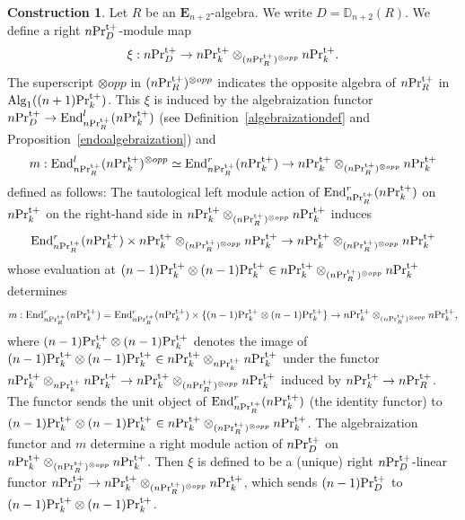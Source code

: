 \documentclass[leqno,12pt]{amsart}
\theoremstyle{plain}
\theoremstyle{definition}
\newtheorem{Construction}[Theorem]{Construction}
\newcommand{\DD}{\mathbb{D}}
\newcommand{\PRTT}{\textup{Pr}^{\textup{t}+}}
\newcommand{\Alg}{\operatorname{Alg}}
\newcommand{\End}{\operatorname{End}}
\begin{document}
\begin{Construction}
\label{xidefine}
Let $R$ be an $\mathbf{E}_{n+2}$-algebra.
We write $D=\DD_{n+2}(R)$.
We define a right  $n\PRTT_D$-module map
\[
\xi:n\PRTT_{D}\to n\PRTT_k\otimes_{(n\PRTT_R)^{\otimes opp}}n\PRTT_k.
\]
The superscript $\otimes opp$ in $(n\PRTT_R)^{\otimes opp}$ indicates the opposite algebra of $n\PRTT_R$ in $\Alg_1((n+1)\PRTT_k)$.
This $\xi$ is
induced by the algebraization functor $n\PRTT_{D}\to \End_{n\PRTT_R}^l(n\PRTT_k)$ (see Definition~\ref{algebraizationdef} and Proposition~\ref{endoalgebraization})
and 
\[
m: \End_{n\PRTT_R}^l(n\PRTT_k)^{\otimes opp}  \simeq \End_{n\PRTT_R}^r(n\PRTT_k)\to n\PRTT_k\otimes_{(n\PRTT_R)^{\otimes opp}}n\PRTT_k
\]
defined as follows: The tautological left module action of $\End_{n\PRTT_R}^r(n\PRTT_k)$ on $n\PRTT_k$ on the right-hand side in $n\PRTT_k\otimes_{(n\PRTT_R)^{\otimes opp}}n\PRTT_k$
induces
\[
\End_{n\PRTT_R}^r(n\PRTT_k)\times n\PRTT_k\otimes_{(n\PRTT_R)^{\otimes opp}}n\PRTT_k\to n\PRTT_k\otimes_{(n\PRTT_R)^{\otimes opp}}n\PRTT_k
\]
whose evaluation at $(n-1)\PRTT_k\otimes (n-1)\PRTT_k\in n\PRTT_k\otimes_{(n\PRTT_R)^{\otimes opp}}n\PRTT_k$ determines
\[
m:\End_{n\PRTT_R}^r(n\PRTT_k)  = \End_{n\PRTT_R}^r(n\PRTT_k)\times \{ (n-1)\PRTT_k\otimes (n-1)\PRTT_k  \}\to n\PRTT_k\otimes_{(n\PRTT_R)^{\otimes opp}}n\PRTT_k,
\]
where $(n-1)\PRTT_k\otimes (n-1)\PRTT_k$ denotes the image of $ (n-1)\PRTT_k\otimes (n-1)\PRTT_k\in n\PRTT_k\otimes_{n\PRTT_k}n\PRTT_k$
under the functor $ n\PRTT_k\otimes_{n\PRTT_k}n\PRTT_k\to  n\PRTT_k\otimes_{(n\PRTT_R)^{\otimes opp}}n\PRTT_k$ induced by $n\PRTT_k\to n\PRTT_R$.
The functor sends the unit object of $\End_{n\PRTT_R}^r(n\PRTT_k)$ (the identity functor)
to $(n-1)\PRTT_k\otimes (n-1)\PRTT_k \in n\PRTT_k\otimes_{(n\PRTT_R)^{\otimes opp}}n\PRTT_k$.
The algebraization functor and $m$ determine a right module action of $n\PRTT_D$ on $n\PRTT_k\otimes_{(n\PRTT_R)^{\otimes opp}}n\PRTT_k$.
Then
$\xi$ is defined to be a (unique) right $n\PRTT_D$-linear functor $n\PRTT_D\to n\PRTT_k\otimes_{(n\PRTT_R)^{\otimes opp}}n\PRTT_k$, which sends $(n-1)\PRTT_D$ to $(n-1)\PRTT_k\otimes(n-1)\PRTT_k$.
\end{Construction}
\end{document}

